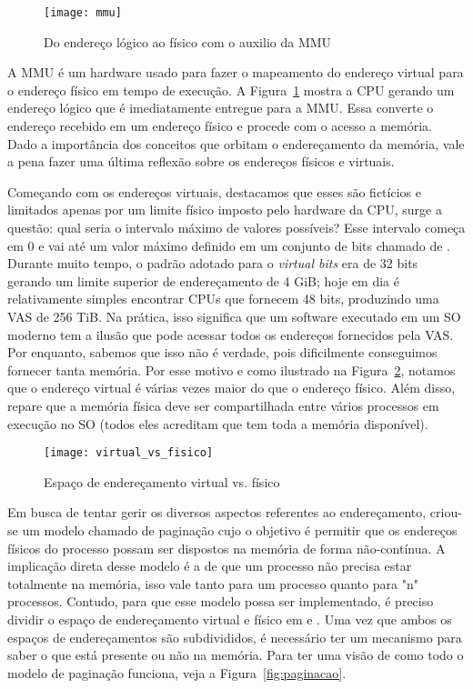\begin{figure}[!h]
  \centering
  \texttt{[image: mmu]} 
  \caption{Do endereço lógico ao físico com o auxilio da MMU}
  \label{fig:mmu}
\end{figure}

A MMU é um hardware usado para fazer o mapeamento do endereço virtual para o
endereço físico em tempo de execução. A Figura~\ref{fig:mmu} mostra a CPU
gerando um endereço lógico que é imediatamente entregue para a MMU. Essa
converte o endereço recebido em um endereço físico e procede com o acesso a
memória. Dado a importância dos conceitos que orbitam o endereçamento da
memória, vale a pena fazer uma última reflexão sobre os endereços físicos e
virtuais.

Começando com os endereços virtuais, destacamos que esses são fictícios e
limitados apenas por um limite físico imposto pelo hardware da CPU, surge a
questão: qual seria o intervalo máximo de valores possíveis? Esse intervalo
começa em 0 e vai até um valor máximo definido em um conjunto de bits chamado
de . Durante muito tempo, o padrão adotado para o
\emph{virtual bits} era de 32 bits gerando um limite superior de endereçamento
de 4 GiB; hoje em dia é relativamente simples encontrar CPUs que fornecem 48
bits, produzindo uma VAS de 256 TiB.  Na prática, isso significa que um
software executado em um SO moderno tem a ilusão que pode acessar todos os
endereços fornecidos pela VAS. Por enquanto, sabemos que isso não é verdade,
pois dificilmente conseguimos fornecer tanta memória. Por esse motivo e como
ilustrado na Figura~\ref{fig:vas_pas}, notamos que o endereço virtual é várias
vezes maior do que o endereço físico. Além disso, repare que a memória física
deve ser compartilhada entre vários processos em execução no SO (todos eles
acreditam que tem toda a memória disponível).

\begin{figure}[!h]
  \centering
  \texttt{[image: virtual\_vs\_fisico]} 
  \caption{Espaço de endereçamento virtual vs. físico}
  \label{fig:vas_pas}
\end{figure}

Em busca de tentar gerir os diversos aspectos referentes ao endereçamento,
criou-se um modelo chamado de paginação cujo o objetivo é permitir que os
endereços físicos do processo possam ser dispostos na memória de forma
não-contínua. A implicação direta desse modelo é a de que um processo não
precisa estar totalmente na memória, isso vale tanto para um processo quanto
para "n" processos. Contudo, para que esse modelo possa ser implementado, é
preciso dividir o espaço de endereçamento virtual e físico em
 e . Uma vez que ambos os espaços de
endereçamentos são subdivididos, é necessário ter um mecanismo para saber o que
está presente ou não na memória. Para ter uma visão de como todo o modelo de
paginação funciona, veja a Figura~\ref{fig:paginacao}.

